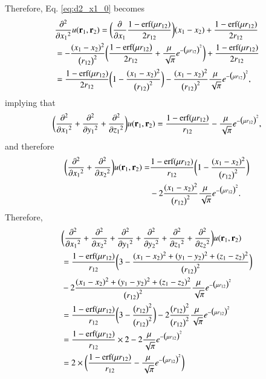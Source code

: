 \documentclass[aip,jcp,reprint,noshowkeys,superscriptaddress]{revtex4-1}
\newcommand{\deriv}[3]{\frac{\partial^{#3} #1}{\partial {#2}^{#3}}}
\newcommand{\br}[0]{{\bf {r}}}
\begin{document}
Therefore, Eq. \eqref{eq:d2_x1_0} becomes 
\begin{equation}
 \begin{aligned}
 \label{eq:d2_x1_2}
& \deriv{}{x_{1}}{2}  u(\br{}_1,\br{}_2) = \bigg( \deriv{}{x_1}{} \frac{1 - \text{erf}(\mu r_{12})}{2 r_{12}}\bigg) (x_1 - x_2 ) +  \frac{1 - \text{erf}(\mu r_{12})}{2 r_{12}}  \\
& = -\frac{(x_1 - x_2)^2}{\big( r_{12} \big)^2}\bigg(\frac{1 - \text{erf}\big( \mu r_{12} \big)}{2 r_{12}}  + \frac{\mu}{\sqrt{\pi}} e^{-\big(\mu r_{12} \big)^2} \bigg) +  \frac{1 - \text{erf}(\mu r_{12})}{2 r_{12}} \\
& = \frac{1 - \text{erf}(\mu r_{12})}{2 r_{12}} \bigg( 1 - \frac{(x_1 - x_2)^2}{\big( r_{12} \big)^2} \bigg) 
- \frac{(x_1 - x_2)^2}{\big( r_{12} \big)^2}\frac{\mu}{\sqrt{\pi}} e^{-\big(\mu r_{12} \big)^2},
 \end{aligned}
\end{equation}
implying that 
\begin{equation}
 \begin{aligned}
 \label{eq:d2_x1_3}
 \bigg( \deriv{}{x_{1}}{2} + \deriv{}{y_{1}}{2} + \deriv{}{z_{1}}{2} \bigg)  u(\br{}_1,\br{}_2) = \frac{1 - \text{erf}(\mu r_{12})}{r_{12}} - \frac{\mu}{\sqrt{\pi}} e^{-\big(\mu r_{12}\big)^2},
 \end{aligned}
\end{equation}
and therefore 
\begin{equation}
 \begin{aligned}
 \label{eq:lapl_u_final}
 \bigg( \deriv{}{x_{1}}{2} + \deriv{}{x_{2}}{2} \bigg) u(\br{}_1,\br{}_2) = & \frac{1 - \text{erf}(\mu r_{12})}{r_{12}} \bigg( 1 - \frac{(x_1 - x_2)^2}{\big( r_{12} \big)^2} \bigg) \\ 
&- 2 \frac{(x_1 - x_2)^2}{\big( r_{12} \big)^2}\frac{\mu}{\sqrt{\pi}} e^{-\big(\mu r_{12} \big)^2}.
 \end{aligned}
\end{equation}
Therefore, 
\begin{equation}
 \begin{aligned}
 \label{eq:d2_x1_2}
 &\bigg( \deriv{}{x_{1}}{2} + \deriv{}{x_{2}}{2} + \deriv{}{y_{1}}{2} + \deriv{}{y_{2}}{2} + \deriv{}{z_{1}}{2} + \deriv{}{z_{2}}{2} \bigg) u(\br{}_1,\br{}_2) \\ 
 & =\frac{1 - \text{erf}(\mu r_{12})}{r_{12}} \bigg( 3 - \frac{(x_1 - x_2)^2 + (y_1 - y_2)^2 + (z_1 - z_2)^2}{\big( r_{12} \big)^2} \bigg) \\ 
&- 2 \frac{(x_1 - x_2)^2 + (y_1 - y_2)^2 + (z_1 - z_2)^2}{\big( r_{12} \big)^2}\frac{\mu}{\sqrt{\pi}} e^{-\big(\mu r_{12} \big)^2} \\
 & =\frac{1 - \text{erf}(\mu r_{12})}{r_{12}} \bigg( 3 - \frac{\big(r_{12}\big)^2}{\big( r_{12} \big)^2} \bigg) 
- 2 \frac{\big(r_{12}\big)^2}{\big( r_{12} \big)^2}\frac{\mu}{\sqrt{\pi}} e^{-\big(\mu r_{12} \big)^2} \\
 & =\frac{1 - \text{erf}(\mu r_{12})}{r_{12}} \times 2 - 2 \frac{\mu}{\sqrt{\pi}} e^{-\big(\mu r_{12} \big)^2} \\
 & = 2 \times \bigg( \frac{1 - \text{erf}(\mu r_{12})}{r_{12}} - \frac{\mu}{\sqrt{\pi}} e^{-\big(\mu r_{12} \big)^2}  \bigg)
 \end{aligned}
\end{equation}
\end{document}
